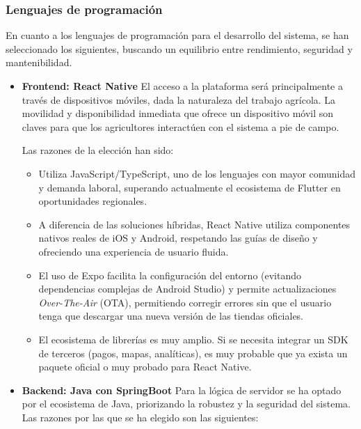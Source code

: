 \subsubsection{Lenguajes de programación}

En cuanto a los lenguajes de programación para el desarrollo del sistema, se han seleccionado los siguientes, buscando un equilibrio 
entre rendimiento, seguridad y mantenibilidad.

\begin{itemize}
    \item \textbf{Frontend: React Native}
    \newline
    El acceso a la plataforma será principalmente a través de dispositivos móviles, dada la naturaleza del trabajo agrícola. La movilidad 
    y disponibilidad inmediata que ofrece un dispositivo móvil son claves para que los agricultores interactúen con el sistema a pie de campo.

    Las razones de la elección han sido:

    \begin{itemize}
        \item Utiliza JavaScript/TypeScript, uno de los lenguajes con mayor comunidad y demanda laboral, superando actualmente el ecosistema 
        de Flutter en oportunidades regionales.
        \item A diferencia de las soluciones híbridas, React Native utiliza componentes nativos reales de iOS y Android, respetando las guías 
        de diseño y ofreciendo una experiencia de usuario fluida.
        \item El uso de Expo facilita la configuración del entorno (evitando dependencias complejas de Android Studio) y permite actualizaciones 
        \textit{Over-The-Air} (OTA), permitiendo corregir errores sin que el usuario tenga que descargar una nueva versión de las tiendas oficiales.
        \item El ecosistema de librerías es muy amplio. Si se necesita integrar un SDK de terceros (pagos, mapas, analíticas), es muy probable que ya exista
        un paquete oficial o muy probado para React Native.
    \end{itemize}

    \item \textbf{Backend: Java con SpringBoot}
    \newline
    Para la lógica de servidor se ha optado por el ecosistema de Java, priorizando la robustez y la seguridad del sistema. Las razones por las que se ha elegido
    son las siguientes:


\end{itemize}
